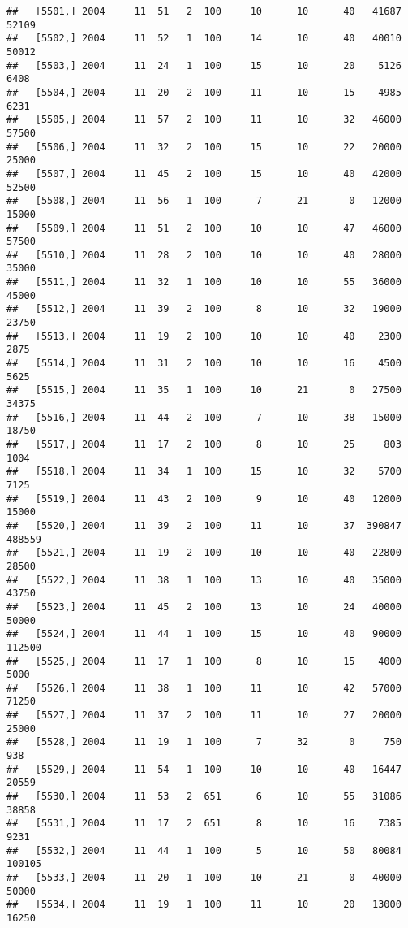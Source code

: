 \documentclass{article}\usepackage[]{graphicx}\usepackage[]{color}
\makeatletter
\newenvironment{kframe}{%
 \def\at@end@of@kframe{}%
 \ifinner\ifhmode%
  \def\at@end@of@kframe{\end{minipage}}%
  \begin{minipage}{\columnwidth}%
 \fi\fi%
 \def\FrameCommand##1{\hskip\@totalleftmargin \hskip-\fboxsep
 \colorbox{shadecolor}{##1}\hskip-\fboxsep
     \hskip-\linewidth \hskip-\@totalleftmargin \hskip\columnwidth}%
 \MakeFramed {\advance\hsize-\width
   \@totalleftmargin\z@ \linewidth\hsize
   \@setminipage}}%
 {\par\unskip\endMakeFramed%
 \at@end@of@kframe}
\newenvironment{knitrout}{}{} %
\makeatother
\begin{document}
\begin{knitrout}
\begin{kframe}
\begin{verbatim}
##   [5501,] 2004     11  51   2  100     10      10      40   41687   52109
##   [5502,] 2004     11  52   1  100     14      10      40   40010   50012
##   [5503,] 2004     11  24   1  100     15      10      20    5126    6408
##   [5504,] 2004     11  20   2  100     11      10      15    4985    6231
##   [5505,] 2004     11  57   2  100     11      10      32   46000   57500
##   [5506,] 2004     11  32   2  100     15      10      22   20000   25000
##   [5507,] 2004     11  45   2  100     15      10      40   42000   52500
##   [5508,] 2004     11  56   1  100      7      21       0   12000   15000
##   [5509,] 2004     11  51   2  100     10      10      47   46000   57500
##   [5510,] 2004     11  28   2  100     10      10      40   28000   35000
##   [5511,] 2004     11  32   1  100     10      10      55   36000   45000
##   [5512,] 2004     11  39   2  100      8      10      32   19000   23750
##   [5513,] 2004     11  19   2  100     10      10      40    2300    2875
##   [5514,] 2004     11  31   2  100     10      10      16    4500    5625
##   [5515,] 2004     11  35   1  100     10      21       0   27500   34375
##   [5516,] 2004     11  44   2  100      7      10      38   15000   18750
##   [5517,] 2004     11  17   2  100      8      10      25     803    1004
##   [5518,] 2004     11  34   1  100     15      10      32    5700    7125
##   [5519,] 2004     11  43   2  100      9      10      40   12000   15000
##   [5520,] 2004     11  39   2  100     11      10      37  390847  488559
##   [5521,] 2004     11  19   2  100     10      10      40   22800   28500
##   [5522,] 2004     11  38   1  100     13      10      40   35000   43750
##   [5523,] 2004     11  45   2  100     13      10      24   40000   50000
##   [5524,] 2004     11  44   1  100     15      10      40   90000  112500
##   [5525,] 2004     11  17   1  100      8      10      15    4000    5000
##   [5526,] 2004     11  38   1  100     11      10      42   57000   71250
##   [5527,] 2004     11  37   2  100     11      10      27   20000   25000
##   [5528,] 2004     11  19   1  100      7      32       0     750     938
##   [5529,] 2004     11  54   1  100     10      10      40   16447   20559
##   [5530,] 2004     11  53   2  651      6      10      55   31086   38858
##   [5531,] 2004     11  17   2  651      8      10      16    7385    9231
##   [5532,] 2004     11  44   1  100      5      10      50   80084  100105
##   [5533,] 2004     11  20   1  100     10      21       0   40000   50000
##   [5534,] 2004     11  19   1  100     11      10      20   13000   16250

\end{verbatim}
\end{kframe}
\end{knitrout}
\end{document}
